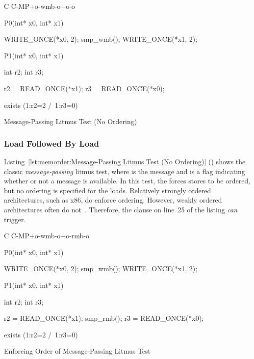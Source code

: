 
\begin{listing}[tbp]
{ \scriptsize
\begin{verbbox}[\LstLineNo]
C C-MP+o-wmb-o+o-o

{
}


P0(int* x0, int* x1) {

  WRITE_ONCE(*x0, 2);
  smp_wmb();
  WRITE_ONCE(*x1, 2);

}

P1(int* x0, int* x1) {

  int r2;
  int r3;

  r2 = READ_ONCE(*x1);
  r3 = READ_ONCE(*x0);

}

exists (1:r2=2 /\ 1:r3=0)
\end{verbbox}
}
\centering
\theverbbox
\caption{Message-Passing Litmus Test (No Ordering)}
\label{lst:memorder:Message-Passing Litmus Test (No Ordering)}
\end{listing}

\subsubsection{Load Followed By Load}
\label{sec:memorder:Load Followed By Load}

Listing~\ref{lst:memorder:Message-Passing Litmus Test (No Ordering)}
()
shows the classic \emph{message-passing} litmus test, where  is
the message and  is a flag indicating whether or not a message
is available.
In this test, the  forces  stores to be ordered,
but no ordering is specified for the loads.
Relatively strongly ordered architectures, such as x86, do enforce ordering.
However, weakly ordered architectures often do
not~\cite{JadeAlglave2011ppcmem}.
Therefore, the  clause on line~25 of the listing \emph{can}
trigger.

\begin{listing}[tbp]
{ \scriptsize
\begin{verbbox}[\LstLineNo]
C C-MP+o-wmb-o+o-rmb-o

{
}

P0(int* x0, int* x1) {

  WRITE_ONCE(*x0, 2);
  smp_wmb();
  WRITE_ONCE(*x1, 2);

}

P1(int* x0, int* x1) {

  int r2;
  int r3;

  r2 = READ_ONCE(*x1);
  smp_rmb();
  r3 = READ_ONCE(*x0);

}

exists (1:r2=2 /\ 1:r3=0)
\end{verbbox}
}
\centering
\theverbbox
\caption{Enforcing Order of Message-Passing Litmus Test}
\label{lst:memorder:Enforcing Order of Message-Passing Litmus Test}
\end{listing}

